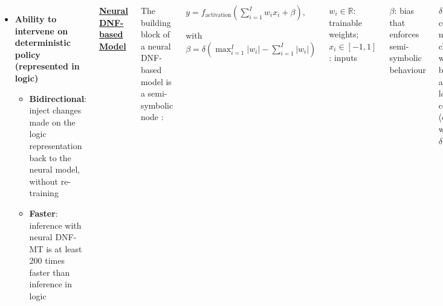 \documentclass{tikzposter} %
\begin{document}
\begin{columns}
{\begin{itemize}
            \item \textbf{Ability to intervene on deterministic policy
                  (represented in logic)}
                  \begin{itemize}
                      \item \textbf{Bidirectional}: inject changes made on the
                            logic representation back to the neural model,
                            without re-training
                      \item \textbf{Faster}: inference with neural DNF-MT is at
                            least 200 times faster than inference in logic
                  \end{itemize}
        \end{itemize}

        \vspace{1em}

        {\color{ImperialBlue}\underline{\sffamily\textbf{Neural DNF-based Model}}}

        \vspace{0.5em}

        The building block of a neural DNF-based model is a semi-symbolic node
        \cite{pix2rule}:

        \begin{center}
            $y = f_{\text{activation}}\left(\sum_{i=1}^{I} w_i x_i + \beta\right), $

            with $\beta = \delta \left(\max_{i=1}^{I}|w_i| - \sum_{i=1}^{I} |w_i|\right)$
        \end{center}

        $w_i \in \mathbb{R}$: trainable weights; $x_i \in [-1, 1]$: inputs

        $\beta$: bias that enforces semi-symbolic behaviour

        $\delta \in [-1, 1]$: controls the node's characteristics, which induces
        behaviour analogous to a logical conjunction (disjunction) when $\delta
            = 1 (-1)$

        $f_{\text{activation}}$: activation function that maps the output to
        $(-1, 1)$

        $y_i \in (-1, 1)$: activation of the semi-symbolic node, which
        represents its belief in a proposition

        \vspace{0.5em}

        {\color{ImperialBlue}\emph{Example}: A conjunctive node with weights
            $[6, 0, -6, 0, 0, 6]$ can be translated into a logical form of $conj
                \leftarrow a\_0, \text{not}\ a\_2, a\_5$ (zero-indexed).}

}
\end{columns}
\end{document}
